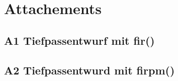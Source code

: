 \section{Attachements}

\subsection{A1 Tiefpassentwurf mit fir()}

\subsection{A2 Tiefpassentwurd mit firpm()}
 
